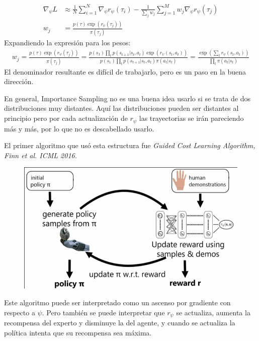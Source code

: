 \begin{align}
    \nabla _ { \psi } L &\approx \frac { 1 } { N } \sum _ { i = 1 } ^ { N } \nabla _ { \psi } r _ {
\psi } ( \tau _ { i } ) - \frac { 1 } { \sum _ { j } w _ { j } } \sum _ { j = 1 } ^ { M } w _ { j
} \nabla _ { \psi } r _ { \psi } ( \tau _ { j } )\\
w _ { j } &= \frac { p ( \tau ) \operatorname { exp } ( r _ { \psi } ( \tau _ { j } ) ) } { \pi ( \tau _ { j } ) }
\end{align}
Expandiendo la expresión para los pesos:
\begin{align}
w _ { j } = \frac { p ( \tau ) \operatorname { exp } ( r _ { \psi } ( \tau _ { j } ) ) } { \pi ( \tau _ { j } ) }
=
\frac { p ( s _ { 1 } ) \prod _ { t } p ( s _ { t + 1 } | s _ { t } , a _ { t } ) \operatorname { exp } ( r _ { \psi } ( s _ { t } , a _ { t } ) ) } { p ( s _ { 1 } ) \prod _ { t } p ( s _ { t + 1 } | s _ { t } , a _ { t } ) \pi ( a _ { t } | s _ { t } ) }
=
\frac{\exp(\sum_t r_\psi(s_t,a_t))}{\prod_t\pi(a_t|s_t)} 
\end{align}
El denominador resultante es difícil de trabajarlo, pero es un paso en la buena dirección.

En general, Importance Sampling no es una buena idea usarlo si se trata de dos distribuciones
muy distantes. Aquí las distribuciones pueden ser distantes al principio pero por cada
actualización de $r_\psi$ las trayectorias se irán pareciendo más y más, por lo que no es
descabellado usarlo.

El primer algoritmo que usó esta estructura fue \textit{ Guided Cost Learning Algorithm, Finn et
al. ICML 2016. }
\begin{figure}[H]
	\centering
	\includegraphics[width=0.5\linewidth]{figures/2020-07-06-161322_736x417_scrot.png}
\end{figure}

Este algoritmo puede ser interpretado como un ascenso por gradiente con respecto a $\psi$.
Pero también se puede interpretar que $r_\psi$ se actualiza, aumenta la recompensa del
experto y disminuye la del agente, y cuando se actualiza la política intenta que su recompensa
sea máxima.

